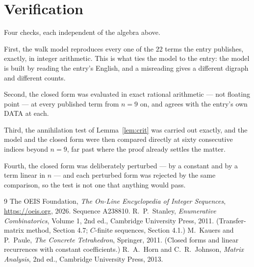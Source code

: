 \documentclass[11pt,a4paper]{article}
\theoremstyle{plain}
\theoremstyle{definition}
\begin{document}
\section{Verification}

Four checks, each independent of the algebra above.

First, the walk model reproduces every one of the $22$ terms the entry publishes,
exactly, in integer arithmetic. This is what ties the model to the entry: the model is built
by reading the entry's English, and a misreading gives a different digraph and different
counts.

Second, the closed form was evaluated in exact rational arithmetic --- not floating point ---
at every published term from $n=9$ on, and agrees with the entry's own DATA at each.

Third, the annihilation test of Lemma~\ref{lem:crit} was carried out exactly, and the model
and the closed form were then compared directly at sixty consecutive indices beyond
$n=9$, far past where the proof already settles the matter.

Fourth, the closed form was deliberately perturbed --- by a constant and by a term linear in
$n$ --- and each perturbed form was rejected by the same comparison, so the test is not one
that anything would pass.

\begin{thebibliography}{9}
 The OEIS Foundation, \emph{The On-Line Encyclopedia of Integer
Sequences}, \url{https://oeis.org}, 2026. Sequence A238810.
 R.~P.~Stanley, \emph{Enumerative Combinatorics}, Volume 1, 2nd ed.,
Cambridge University Press, 2011. (Transfer-matrix method, Section 4.7; $C$-finite sequences,
Section 4.1.)
 M.~Kauers and P.~Paule, \emph{The Concrete Tetrahedron}, Springer, 2011.
(Closed forms and linear recurrences with constant coefficients.)
 R.~A.~Horn and C.~R.~Johnson, \emph{Matrix Analysis}, 2nd ed., Cambridge
University Press, 2013.
\end{thebibliography}
\end{document}
